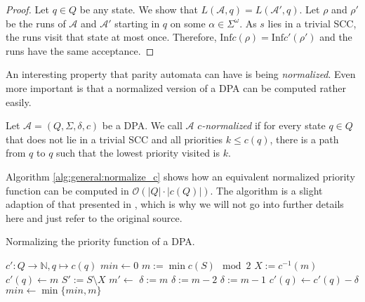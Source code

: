 \begin{proof}
	Let $q \in Q$ be any state. We show that $L(\mathcal{A}, q) = L(\mathcal{A}', q)$. Let $\rho$ and $\rho'$ be the runs of $\mathcal{A}$ and $\mathcal{A}'$ starting in $q$ on some $\alpha \in \Sigma^\omega$. As $s$ lies in a trivial SCC, the runs visit that state at most once. Therefore, $\text{Inf} c(\rho) = \text{Inf} c'(\rho')$ and the runs have the same acceptance.
\end{proof}

\vspace{10pt}

An interesting property that parity automata can have is being \emph{normalized}. Even more important is that a normalized version of a DPA can be computed rather easily.

\begin{defn}
	Let $\mathcal{A} = (Q, \Sigma, \delta, c)$ be a DPA. We call $\mathcal{A}$ \emph{$c$-normalized} if for every state $q \in Q$ that does not lie in a trivial SCC and all priorities $k \leq c(q)$, there is a path from $q$ to $q$ such that the lowest priority visited is $k$.
\end{defn}


Algorithm \ref{alg:general:normalize_c} shows how an equivalent normalized priority function can be computed in $\mathcal{O}(|Q| \cdot |c(Q)|)$. The algorithm is a slight adaption of that presented in \cite{CartonMaceiras99}, which is why we will not go into further details here and just refer to the original source.

\begin{algorithm}
  \caption{Normalizing the priority function of a DPA.}
  \label{alg:general:normalize_c}
  \begin{algorithmic}[1]
      \State $c' : Q \rightarrow \mathbb{N}, q \mapsto c(q)$
      \State {}
      \State {}
    \EndFunction
    \Statex
        \State {}
      \EndIf
      \State $min \gets 0$
        \State $m := \min c(S) \mod 2$
        \State $X := c^{-1}(m)$
          \State $c'(q) \gets m$
        \EndFor
        \State $S' := S \setminus X$
        \State $m' \gets $
            \State $\delta := m$
          \Else
            \State $\delta := m-2$
          \EndIf
        \Else
          \State $\delta := m-1$
        \EndIf
          \State $c'(q) \gets c'(q) - \delta$
        \EndFor
        \State $min \gets \min \{min, m\}$
      \EndFor
      \State {}
    \EndFunction
  \end{algorithmic}
\end{algorithm}











